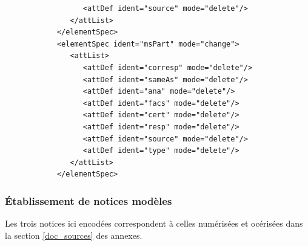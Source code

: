 \documentclass[a4paper,12pt,twoside]{book}
\begin{document}
\begin{verbatim}
                  <attDef ident="source" mode="delete"/>
               </attList>
            </elementSpec>
            <elementSpec ident="msPart" mode="change">
               <attList>
                  <attDef ident="corresp" mode="delete"/>
                  <attDef ident="sameAs" mode="delete"/>
                  <attDef ident="ana" mode="delete"/>
                  <attDef ident="facs" mode="delete"/>
                  <attDef ident="cert" mode="delete"/>
                  <attDef ident="resp" mode="delete"/>
                  <attDef ident="source" mode="delete"/>
                  <attDef ident="type" mode="delete"/>
               </attList>
            </elementSpec>
	\end{verbatim}
	
	\subsubsection{\label{notices_modeles}Établissement de notices modèles}
	
	Les trois notices ici encodées correspondent à celles numérisées et océrisées dans la section \ref{doc_sources} des annexes. 
	
\end{document}
